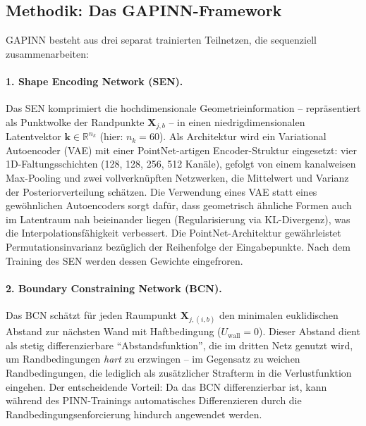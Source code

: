 \documentclass[a4paper,12pt]{article}
\begin{document}
\subsection*{Methodik: Das GAPINN-Framework}

GAPINN besteht aus drei separat trainierten Teilnetzen, die sequenziell
zusammenarbeiten:

\paragraph{1. Shape Encoding Network (SEN).}
Das SEN komprimiert die hochdimensionale Geometrieinformation -- repr\"asentiert
als Punktwolke der Randpunkte $\mathbf{X}_{j,b}$ -- in einen niedrigdimensionalen
Latentvektor $\mathbf{k} \in \mathbb{R}^{n_k}$ (hier: $n_k = 60$). Als
Architektur wird ein Variational Autoencoder (VAE) mit einer PointNet-artigen
Encoder-Struktur eingesetzt: vier 1D-Faltungsschichten (128, 128, 256, 512
Kan\"ale), gefolgt von einem kanalweisen Max-Pooling und zwei vollverkn\"upften
Netzwerken, die Mittelwert und Varianz der Posteriorverteilung sch\"atzen.
Die Verwendung eines VAE statt eines gew\"ohnlichen Autoencoders sorgt daf\"ur,
dass geometrisch \"ahnliche Formen auch im Latentraum nah beieinander liegen
(Regularisierung via KL-Divergenz), was die Interpolationsf\"ahigkeit verbessert.
Die PointNet-Architektur gew\"ahrleistet Permutationsinvarianz bez\"uglich der
Reihenfolge der Eingabepunkte. Nach dem Training des SEN werden dessen Gewichte
eingefroren.

\paragraph{2. Boundary Constraining Network (BCN).}
Das BCN sch\"atzt f\"ur jeden Raumpunkt $\mathbf{X}_{j,(i,b)}$ den minimalen
euklidischen Abstand zur n\"achsten Wand mit Haftbedingung ($U_\text{wall} = 0$).
Dieser Abstand dient als stetig differenzierbare ``Abstandsfunktion'', die im
dritten Netz genutzt wird, um Randbedingungen \emph{hart} zu erzwingen -- im
Gegensatz zu weichen Randbedingungen, die lediglich als zus\"atzlicher
Strafterm in die Verlustfunktion eingehen. Der entscheidende Vorteil: Da das BCN
differenzierbar ist, kann w\"ahrend des PINN-Trainings automatisches
Differenzieren durch die Randbedingungsenforcierung hindurch angewendet werden.
\end{document}
